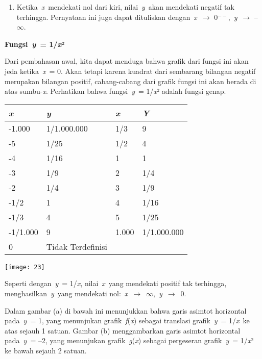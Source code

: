 \documentclass[11pt,fleqn]{book} %
\begin{document}
\begin{myEnumerate}
\begin{itemize}
\begin{enumerate}
\item  Ketika~\textit{x}~mendekati nol dari kiri, nilai~\textit{y}~akan mendekati negatif tak terhingga. Pernyataan ini juga dapat dituliskan dengan~\textit{x}~$\mathrm{\to}$ 0${}^{--}$,~\textit{y}~$\mathrm{\to}$ --$\mathrm{\infty}$.
\end{enumerate}

\noindent \textbf{Fungsi~\textit{y}~= 1/\textit{x}²}

\noindent Dari pembahasan awal, kita dapat menduga bahwa grafik dari fungsi ini akan jeda ketika~\textit{x}~= 0. Akan tetapi karena kuadrat dari sembarang bilangan negatif merupakan bilangan positif, cabang-cabang dari grafik fungsi ini akan berada di atas sumbu-\textit{x}. Perhatikan bahwa fungsi~\textit{y}~= 1/\textit{x}² adalah fungsi genap.

\begin{tabular}{|p{1.1in}|p{1.1in}|p{1.1in}|p{1.1in}|} \hline 
\textit{x} & \textit{y} & \textit{x} & \textit{Y} \\ \hline 
-1.000 & 1/1.000.000 & 1/3 & 9 \\ \hline 
-5 & 1/25 & 1/2 & 4 \\ \hline 
-4 & 1/16 & 1 & 1 \\ \hline 
-3 & 1/9 & 2 & 1/4 \\ \hline 
-2 & 1/4 & 3 & 1/9 \\ \hline 
-1/2 & 1 & 4 & 1/16 \\ \hline 
-1/3 & 4 & 5 & 1/25 \\ \hline 
-1/1.000 & 9 & 1.000 & 1/1.000.000 \\ \hline 
0 & Tidak Terdefinisi &  &  \\ \hline 
\end{tabular}

\begin{center}
\texttt{[image: 23]}
\end{center}

Seperti dengan~\textit{y}~= 1/\textit{x}, nilai~\textit{x}~yang mendekati positif tak terhingga, menghasilkan~\textit{y}~yang mendekati nol:~\textit{x}~$\mathrm{\to}$~$\mathrm{\infty}$,~\textit{y}~$\mathrm{\to}$~0. 

Dalam gambar (a) di bawah ini menunjukkan bahwa garis asimtot horizontal pada~\textit{y}~= 1, yang menunjukan grafik~\textit{f}(\textit{x}) sebagai translasi grafik~\textit{y}~= 1/\textit{x}~ke atas sejauh 1 satuan. Gambar (b) menggambarkan garis asimtot horizontal pada~\textit{y}~= --2, yang menunjukan grafik~\textit{g}(\textit{x}) sebagai pergeseran grafik~\textit{y}~= 1/\textit{x}² ke bawah sejauh 2 satuan.


\end{itemize}
\end{myEnumerate}
\end{document}
